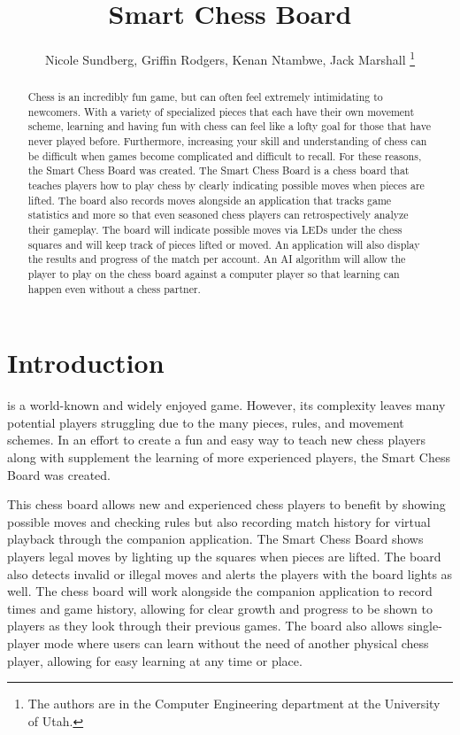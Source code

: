\documentclass[11pt,journal]{IEEEtran}
\begin{document}
\title{Smart Chess Board}

\author{Nicole Sundberg, Griffin Rodgers, Kenan Ntambwe, Jack Marshall
  \thanks{The authors are in the Computer Engineering
    department at the University of Utah.}
}
\maketitle


\begin{abstract}
Chess is an incredibly fun game, but can often feel extremely intimidating to newcomers. With a variety of specialized pieces that each have their own movement scheme, learning and having fun with chess can feel like a lofty goal for those that have never played before. Furthermore, increasing your skill and understanding of chess can be difficult when games become complicated and difficult to recall. For these reasons, the Smart Chess Board was created.  The Smart Chess Board is a chess board that teaches players how to play chess by clearly indicating possible moves when pieces are lifted.  The board also records moves alongside an application that tracks game statistics and more so that even seasoned chess players can retrospectively analyze their gameplay. The board will indicate possible moves via LEDs under the chess squares and will keep track of pieces lifted or moved. An application will also display the results and progress of the match per account. An AI algorithm will allow the player to play on the chess board against a computer player so that learning can happen even without a chess partner. 
\end{abstract}

\section{Introduction}

 is a world-known and widely enjoyed game. However, its complexity leaves many potential players struggling due to the many pieces, rules, and movement schemes. In an effort to create a fun and easy way to teach new chess players along with supplement the learning of more experienced players, the Smart Chess Board was created. 

This chess board allows new and experienced chess players to benefit by showing possible moves and checking rules but also recording match history for virtual playback through the companion application. The Smart Chess Board shows players legal moves by lighting up the squares when pieces are lifted. The board also detects invalid or illegal moves and alerts the players with the board lights as well.  The chess board will work alongside the companion application to record times and game history, allowing for clear growth and progress to be shown to players as they look through their previous games. The board also allows single-player mode where users can learn without the need of another physical chess player, allowing for easy learning at any time or place.
\end{document}
